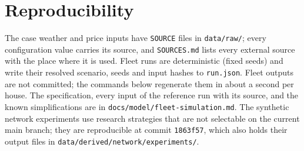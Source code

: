 \section{Reproducibility}
\label{app:repro}
The case weather and price inputs have \texttt{SOURCE} files in \texttt{data/raw/}; every
configuration value carries its source, and \texttt{SOURCES.md} lists every external source with
the place where it is used. Fleet runs are deterministic (fixed seeds) and write their resolved
scenario, seeds and input hashes to \texttt{run.json}. Fleet outputs are not committed; the
commands below regenerate them in about a second per house. The specification, every input of the
reference run with its source, and the known simplifications are in
\texttt{docs/model/fleet-simulation.md}. The synthetic network experiments use research strategies
that are not selectable on the current main branch; they are reproducible at commit
\texttt{1863f57}, which also holds their output files in \texttt{data/derived/network/experiments/}.


